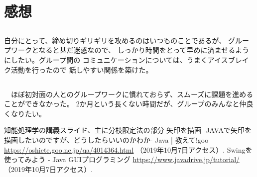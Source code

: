 \documentclass{jarticle}
\begin{document}
\section{感想}
\subsection{}
  自分にとって、締め切りギリギリを攻めるのはいつものことであるが、
  グループワークとなると甚だ迷惑なので、
  しっかり時間をとって早めに済ませるようにしたい。グループ間の
  コミュニケーションについては、うまくアイスブレイク活動を行ったので
  話しやすい関係を築けた。
\subsection{}
　ほぼ初対面の人とのグループワークに慣れておらず、スムーズに課題を進めることができなかった。
  2か月という長くない時間だが、グループのみんなと仲良くなりたい。

\begin{thebibliography}{99}
   知能処理学の講義スライド、主に分枝限定法の部分
   矢印を描画 -JAVAで矢印を描画したいのですが、どうしたらいいのかわか- Java | 教えて!goo
  \url{https://oshiete.goo.ne.jp/qa/4014364.html} （2019年10月7日アクセス）.
   Swingを使ってみよう - Java GUIプログラミング
  \url{https://www.javadrive.jp/tutorial/} （2019年10月7日アクセス）.
\end{thebibliography}
\end{document}
